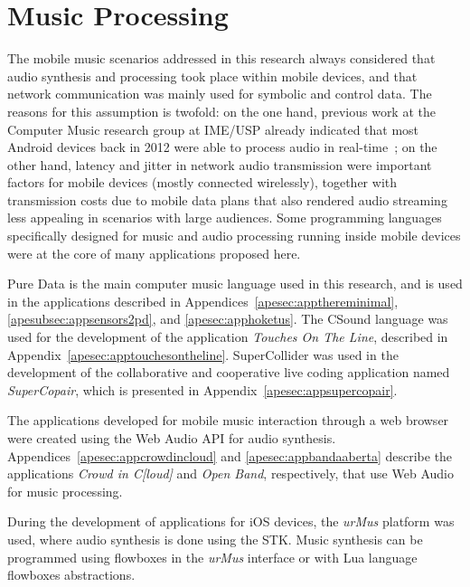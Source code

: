 \section{Music Processing}

The mobile music scenarios addressed in this research always considered that audio synthesis and processing took place within mobile devices, and that network communication was mainly used for symbolic and control data. The reasons for this assumption is twofold: on the one hand, previous work at the Computer Music research group at IME/USP already indicated that most Android devices back in 2012 were able to process audio in real-time~\citep{bianchi2014processamento}; on the other hand, latency and jitter in network audio transmission were important factors for mobile devices (mostly connected wirelessly), together with transmission costs due to mobile data plans that also rendered audio streaming less appealing in scenarios with large audiences. Some programming languages specifically designed for music and audio processing running inside mobile devices were at the core of many applications proposed here.


Pure Data is the main computer music language used in this research, and is used in the applications described in Appendices~\ref{apesec:appthereminimal}, \ref{apesubsec:appsensors2pd}, and \ref{apesec:apphoketus}.
The CSound language was used for the development of the application \textit{Touches On The Line}, described in Appendix~\ref{apesec:apptouchesontheline}.
SuperCollider was used in the development of the collaborative and cooperative live coding application named \textit{SuperCopair}, which is presented in Appendix~\ref{apesec:appsupercopair}.

The applications developed for mobile music interaction through a web browser were created using the Web Audio API for audio synthesis.
Appendices~\ref{apesec:appcrowdincloud} and \ref{apesec:appbandaaberta} describe the applications \textit{Crowd in C[loud]} and \textit{Open Band}, respectively, that use Web Audio for music processing.

During the development of applications for iOS devices, the \textit{urMus} platform was used, where audio synthesis is done using the STK.
Music synthesis can be programmed using flowboxes in the \textit{urMus} interface or with Lua language flowboxes abstractions.

